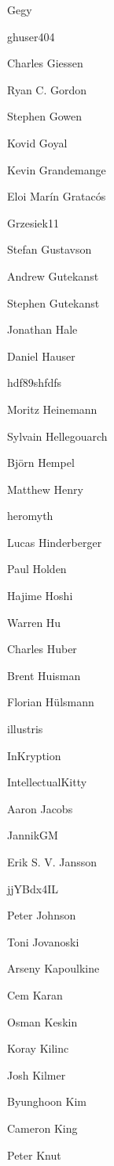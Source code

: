 \begin{DoxyItemize}
\item Gegy
\item ghuser404
\item Charles Giessen
\item Ryan C. Gordon
\item Stephen Gowen
\item Kovid Goyal
\item Kevin Grandemange
\item Eloi Marín Gratacós
\item Grzesiek11
\item Stefan Gustavson
\item Andrew Gutekanst
\item Stephen Gutekanst
\item Jonathan Hale
\item Daniel Hauser
\item hdf89shfdfs
\item Moritz Heinemann
\item Sylvain Hellegouarch
\item Björn Hempel
\item Matthew Henry
\item heromyth
\item Lucas Hinderberger
\item Paul Holden
\item Hajime Hoshi
\item Warren Hu
\item Charles Huber
\item Brent Huisman
\item Florian Hülsmann
\item illustris
\item In\+Kryption
\item Intellectual\+Kitty
\item Aaron Jacobs
\item Jannik\+GM
\item Erik S. V. Jansson
\item jj\+YBdx4\+IL
\item Peter Johnson
\item Toni Jovanoski
\item Arseny Kapoulkine
\item Cem Karan
\item Osman Keskin
\item Koray Kilinc
\item Josh Kilmer
\item Byunghoon Kim
\item Cameron King
\item Peter Knut

\end{DoxyItemize}
